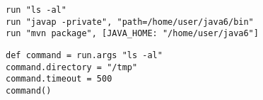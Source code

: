 \begin{lstlisting}[style=Groovybash, label={lst:example_run1}, title={
Examples to execute external commands.}]
run "ls -al"
run "javap -private", "path=/home/user/java6/bin"
run "mvn package", [JAVA_HOME: "/home/user/java6"]
\end{lstlisting}

\begin{lstlisting}[style=Groovybash, label={lst:example_run2}, title={
Deleyed execution of external commands.}]
def command = run.args "ls -al"
command.directory = "/tmp"
command.timeout = 500
command()
\end{lstlisting}

